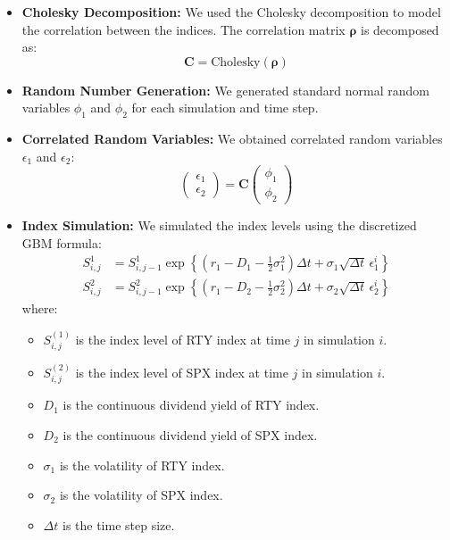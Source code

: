 \documentclass[12pt,a4paper]{article}
\begin{document}
\begin{itemize}
    \item \textbf{Cholesky Decomposition:} We used the Cholesky decomposition to model the correlation between the indices. The correlation matrix \( \boldsymbol{\rho} \) is decomposed as:
    \[
    \mathbf{C} = \text{Cholesky}(\boldsymbol{\rho})
    \]
    \item \textbf{Random Number Generation:} We generated standard normal random variables \( \phi_1 \) and \( \phi_2 \) for each simulation and time step.
    \item \textbf{Correlated Random Variables:} We obtained correlated random variables \( \epsilon_1 \) and \( \epsilon_2 \):
    \[
    \begin{pmatrix} \epsilon_1 \\ \epsilon_2 \end{pmatrix} = \mathbf{C} \begin{pmatrix} \phi_1 \\ \phi_2 \end{pmatrix}
    \]
    \item \textbf{Index Simulation:} We simulated the index levels using the discretized GBM formula:
\begin{align*}
S_{i,j}^{1} &= S_{i,j-1}^{1} \exp\left\{ \left( r_1 - D_1 - \tfrac{1}{2} \sigma_1^2 \right) \Delta t + \sigma_1 \sqrt{\Delta t} \, \epsilon_1^{i} \right\} \\
S_{i,j}^{2} &= S_{i,j-1}^{2} \exp\left\{ \left( r_1 - D_2 - \tfrac{1}{2} \sigma_2^2 \right) \Delta t + \sigma_2 \sqrt{\Delta t} \, \epsilon_2^{i} \right\}
\end{align*}
    where:
    \begin{itemize}
        \item \( S_{i,j}^{(1)} \) is the index level of RTY index at time \( j \) in simulation \( i \).
        \item \( S_{i,j}^{(2)} \) is the index level of SPX index at time \( j \) in simulation \( i \).
        \item \( D_1 \) is the continuous dividend yield of RTY index.
	\item \( D_2 \) is the continuous dividend yield of SPX index.
        \item \( \sigma_1 \) is the volatility of RTY index.
	\item \( \sigma_2 \) is the volatility of SPX index.
        \item \( \Delta t \) is the time step size.
    \end{itemize}
\end{itemize}
\end{document}
